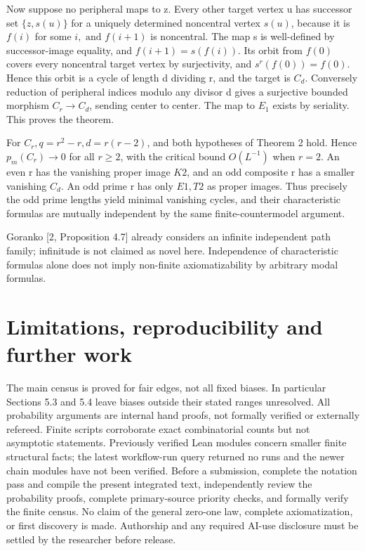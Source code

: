 \documentclass[11pt]{article}
\begin{document}
Now suppose no peripheral maps to z. Every other target vertex u has successor set $\{z,s(u)\}$ for a uniquely determined noncentral vertex $s(u)$, because it is $f(i)$ for some $i, \text{ and } f(i+1)$ is noncentral. The map s is well-defined by successor-image equality, and $f(i+1)=s(f(i))$. Its orbit from $f(0)$ covers every noncentral target vertex by surjectivity, and $s^{r}(f(0))=f(0)$. Hence this orbit is a cycle of length d dividing r, and the target is $C_{d}$. Conversely reduction of peripheral indices modulo any divisor d gives a surjective bounded morphism $C_{r}\to C_{d}$, sending center to center. The map to $E_{1}$ exists by seriality. This proves the theorem.

For $C_{r}, q=r^{2}-r, d=r(r-2)$, and both hypotheses of Theorem 2 hold. Hence $p_{m}(C_{r})\to 0$ for all $r\geq 2$, with the critical bound $O(L^{-1})$ when $r=2$. An even r has the vanishing proper image $K2$, and an odd composite r has a smaller vanishing $C_{d}$. An odd prime r has only $E1,T2$ as proper images. Thus precisely the odd prime lengths yield minimal vanishing cycles, and their characteristic formulas are mutually independent by the same finite-countermodel argument.

Goranko [2, Proposition 4.7] already considers an infinite independent path family; infinitude is not claimed as novel here. Independence of characteristic formulas alone does not imply non-finite axiomatizability by arbitrary modal formulas.

\section{Limitations, reproducibility and further work}

The main census is proved for fair edges, not all fixed biases. In particular Sections 5.3 and 5.4 leave biases outside their stated ranges unresolved. All probability arguments are internal hand proofs, not formally verified or externally refereed. Finite scripts corroborate exact combinatorial counts but not asymptotic statements. Previously verified Lean modules concern smaller finite structural facts; the latest workflow-run query returned no runs and the newer chain modules have not been verified. Before a submission, complete the notation pass and compile the present integrated text, independently review the probability proofs, complete primary-source priority checks, and formally verify the finite census. No claim of the general zero-one law, complete axiomatization, or first discovery is made. Authorship and any required AI-use disclosure must be settled by the researcher before release.
\end{document}
